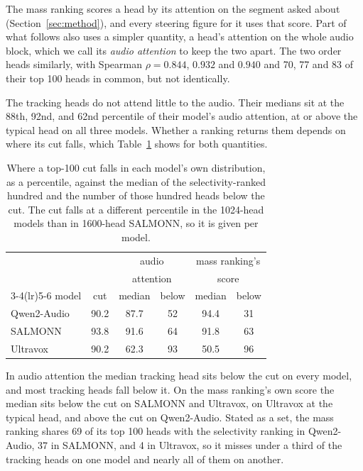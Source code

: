 \documentclass[11pt]{article}
\begin{document}
The mass ranking scores a head by its attention on the segment asked about
(Section~\ref{sec:method}), and every steering figure for it uses that score. Part
of what follows also uses a simpler quantity, a head's attention on the whole
audio block, which we call its \emph{audio attention} to keep the two apart. The
two order heads similarly, with Spearman $\rho = 0.844$, $0.932$ and $0.940$ and
70, 77 and 83 of their top 100 heads in common, but not identically.

The tracking heads do not attend little to the audio. Their medians sit at the
88th, 92nd, and 62nd percentile of their model's audio attention, at or above the
typical head on all three models. Whether a ranking returns them depends on where
its cut falls, which Table~\ref{tab:cutoff} shows for both quantities.

\begin{table}[t]\centering\small\setlength{\tabcolsep}{4pt}
\begin{tabular}{lccccc}
\toprule
 & & \multicolumn{2}{c}{audio} & \multicolumn{2}{c}{mass ranking's} \\
 & & \multicolumn{2}{c}{attention} & \multicolumn{2}{c}{score} \\
\cmidrule(lr){3-4}\cmidrule(lr){5-6}
model & cut & median & below & median & below \\
\midrule
Qwen2-Audio & 90.2 & 87.7 & 52 & 94.4 & 31 \\
SALMONN     & 93.8 & 91.6 & 64 & 91.8 & 63 \\
Ultravox    & 90.2 & 62.3 & 93 & 50.5 & 96 \\
\bottomrule
\end{tabular}
\caption{Where a top-100 cut falls in each model's own distribution, as a
percentile, against the median of the selectivity-ranked hundred and the number
of those hundred heads below the cut. The cut falls at a different percentile in
the 1024-head models than in 1600-head SALMONN, so it is given per model.}
\label{tab:cutoff}
\end{table}

In audio attention the median tracking head sits below the cut on every model,
and most tracking heads fall below it. On the mass ranking's own score the median
sits below the cut on SALMONN and Ultravox, on Ultravox at the typical head, and
above the cut on Qwen2-Audio. Stated as a set, the mass ranking shares 69 of its
top 100 heads with the selectivity ranking in Qwen2-Audio, 37 in SALMONN, and 4
in Ultravox, so it misses under a third of the tracking heads on one model and
nearly all of them on another.
\end{document}
